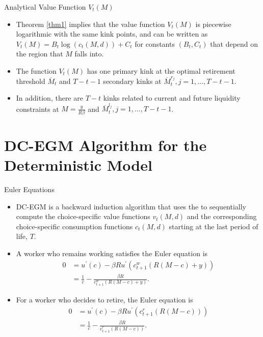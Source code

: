\documentclass[aspectratio=169]{beamer}
\newcommand{\highlight}[1]{{\color{red}{#1}}}
\begin{document}
\begin{frame}{Analytical Value Function $V_t(M)$}

	\begin{itemize}
		\item Theorem \ref{thm1} implies that the value function $V_t(M)$ is piecewise logarithmic with the same kink points, and can be written as $V_t(M) = B_t \log(c_t (M, d)) + C_t$ for constants $(B_t, C_t)$ that depend on the region that $M$ falls into.
		\item The function $V_t(M)$ has one primary kink at the optimal retirement threshold $\overline{M}_t$ and $T-t-1$ secondary kinks at $\overline{M}_t^{r_j}, j = 1, \ldots, T-t-1$.
		\item In addition, there are $T-t$ kinks related to current and future liquidity constraints at $M=\frac{y}{R\beta}$ and $\overline{M}_t^{l_j}, j = 1, \ldots, T-t-1$.

	\end{itemize}
	
\end{frame}

\section[DC-EGM without Taste Shocks]{DC-EGM Algorithm for the Deterministic Model}

\begin{frame}{Euler Equations}

	\begin{itemize}
		\item DC-EGM is a backward induction algorithm that uses the \highlight{inverted Euler equation} to sequentially compute the choice-specific value functions $v_t(M, d)$ and the corresponding choice-specific consumption functions $c_t(M, d)$ starting at the last period of life, $T$.
		\item A worker who remains working satisfies the Euler equation is 
		\begin{equation}
			\label{10}
			\begin{aligned}
				0 & =u^{\prime}(c)-\beta R u^{\prime}\left(c_{t+1}^w(R(M-c)+y)\right) \\
				& =\frac{1}{c}-\frac{\beta R}{c_{t+1}^w(R(M-c)+y)} .
			\end{aligned}
		\end{equation}
		\item For a worker who decides to retire, the Euler equation is 
		\begin{equation}
			\label{11}
			\begin{aligned}
				0 & =u^{\prime}(c)-\beta R u^{\prime}\left(c_{t+1}^r(R(M-c))\right) \\
				& =\frac{1}{c}-\frac{\beta R}{c_{t+1}^r(R(M-c))} .
				\end{aligned}
		\end{equation}
		
	\end{itemize}
	
\end{frame}
\end{document}
